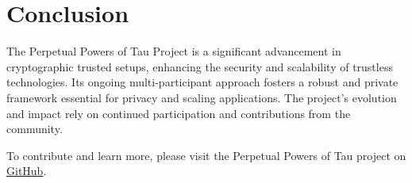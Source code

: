 \documentclass[11pt]{article}
\begin{document}
\section{Conclusion}
\label{sec:org78c3e96}

The Perpetual Powers of Tau Project is a significant advancement in cryptographic trusted setups, enhancing the security and scalability of trustless technologies. Its ongoing multi-participant approach fosters a robust and private framework essential for privacy and scaling applications. The project's evolution and impact rely on continued participation and contributions from the community.

To contribute and learn more, please visit the Perpetual Powers of Tau project on \href{https://github.com/privacy-scaling-explorations/perpetualpowersoftau/tree/master}{GitHub}.
\end{document}
